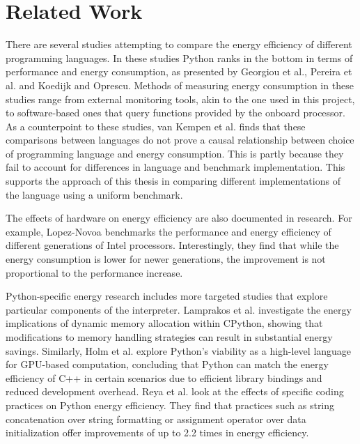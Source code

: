 \section{Related Work}
\label{sec:relatedwork}
There are several studies attempting to compare the energy efficiency of different programming languages. In these studies Python ranks in the bottom in terms of performance and energy consumption, as presented by Georgiou et al.\cite{georgiou2017analyzing}, Pereira et al.\cite{pereira_rank_efficiency, pereira2017energy} and Koedijk and Oprescu\cite{koedijk2022finding}. Methods of measuring energy consumption in these studies range from external monitoring tools, akin to the one used in this project, to software-based ones that query functions provided by the onboard processor. As a counterpoint to these studies, van Kempen et al.\cite{van2024s} finds that these comparisons between languages do not prove a causal relationship between choice of programming language and energy consumption. This is partly because they fail to account for differences in language and benchmark implementation. This supports the approach of this thesis in comparing different implementations of the language using a uniform benchmark.

The effects of hardware on energy efficiency are also documented in research. For example, Lopez-Novoa\cite{lopez2019exploring} benchmarks the performance and energy efficiency of different generations of Intel processors. Interestingly, they find that while the energy consumption is lower for newer generations, the improvement is not proportional to the performance increase.

Python-specific energy research includes more targeted studies that explore particular components of the interpreter. Lamprakos et al.\cite{lamprakos_energy} investigate the energy implications of dynamic memory allocation within CPython, showing that modifications to memory handling strategies can result in substantial energy savings. Similarly, Holm et al.\cite{holm2020gpu} explore Python’s viability as a high-level language for GPU-based computation, concluding that Python can match the energy efficiency of C++ in certain scenarios due to efficient library bindings and reduced development overhead. Reya et al.\cite{reya2023greenpy} look at the effects of specific coding practices on Python energy efficiency. They find that practices such as string concatenation over string formatting or assignment operator over data initialization offer improvements of up to 2.2 times in energy efficiency. 

